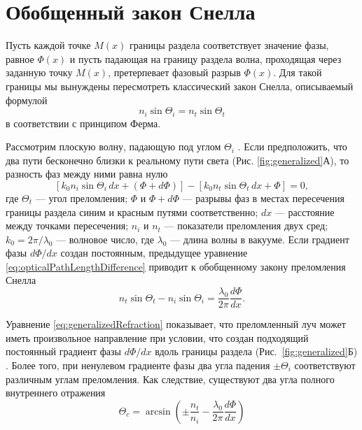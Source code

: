 \section{Обобщенный закон Снелла}

Пусть каждой точке $M(x)$ границы раздела соответствует значение фазы, равное $\Phi(x)$ и пусть падающая на границу раздела волна, проходящая через заданную точку $M(x)$, претерпевает фазовый разрыв $\Phi(x)$. Для такой границы мы вынуждены пересмотреть классический закон Снелла, описываемый формулой
\begin{equation}
    n_i \sin \Theta_i = n_t \sin \Theta_t
\end{equation}
в соответствии с принципом Ферма.

Рассмотрим плоскую волну, падающую под углом $\Theta_i$ . Если предположить, что два пути бесконечно близки к реальному пути света (Рис. \ref{fig:generalized}А), то разность фаз между ними равна нулю
\begin{equation}
    \label{eq:opticalPathLengthDifference}
    [k_0n_i\sin\Theta_i\, dx + (\Phi + d\Phi)] - [k_0n_t\sin\Theta_t\,dx + \Phi] = 0,
\end{equation}
где $\Theta_t$ --- угол преломления; $\Phi$ и $\Phi + d\Phi$ --- разрывы фаз в местах пересечения границы раздела синим и красным путями соответственно; $dx$ --- расстояние между точками пересечения; $n_i$ и $n_t$ --- показатели преломления двух сред; $k_0 = 2\pi/\lambda_0$ --- волновое число, где $\lambda_0$ --- длина волны в вакууме. Если градиент фазы $d\Phi/dx$ создан постоянным, предыдущее уравнение \eqref{eq:opticalPathLengthDifference} приводит к обобщенному закону преломления Снелла
\begin{equation}
    \label{eq:generalizedRefraction}
    n_t\sin\Theta_t - n_i \sin\Theta_i = \frac{\lambda_0}{2\pi}\frac{d\Phi}{dx}.
\end{equation}

Уравнение \eqref{eq:generalizedRefraction} показывает, что преломленный луч может иметь произвольное направление при условии, что создан подходящий постоянный градиент фазы $d\Phi/dx$ вдоль границы раздела (Рис.~\ref{fig:generalized}Б) \cite{generalized2011}. Более того, при ненулевом градиенте фазы два угла падения $\pm \Theta_i$ соответствуют различным углам преломления. Как следствие, существуют два угла полного внутреннего отражения
\begin{equation}
    \Theta_c = \arcsin \left(\pm\frac{n_t}{n_i} - \frac{\lambda_0}{2\pi}\frac{d\Phi}{dx}\right)
\end{equation}


